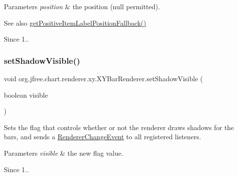 \begin{DoxyParams}{Parameters}
{\em position} & the position ({\ttfamily null} permitted).\\
\hline
\end{DoxyParams}
\begin{DoxySeeAlso}{See also}
\mbox{\hyperlink{classorg_1_1jfree_1_1chart_1_1renderer_1_1xy_1_1_x_y_bar_renderer_aef50803eeebe109e0a137245d5099f76}{get\+Positive\+Item\+Label\+Position\+Fallback()}} 
\end{DoxySeeAlso}
\begin{DoxySince}{Since}
1.. 
\end{DoxySince}
\mbox{\label{classorg_1_1jfree_1_1chart_1_1renderer_1_1xy_1_1_x_y_bar_renderer_aa5b0e04cebea57af1bcbf9193c007456}} 
\subsubsection{\texorpdfstring{set\+Shadow\+Visible()}{setShadowVisible()}}
{\footnotesize\ttfamily void org.\+jfree.\+chart.\+renderer.\+xy.\+X\+Y\+Bar\+Renderer.\+set\+Shadow\+Visible (\begin{DoxyParamCaption}\item[{boolean}]{visible }\end{DoxyParamCaption})}

Sets the flag that controls whether or not the renderer draws shadows for the bars, and sends a \mbox{\hyperlink{}{Renderer\+Change\+Event}} to all registered listeners.


\begin{DoxyParams}{Parameters}
{\em visible} & the new flag value.\\
\hline
\end{DoxyParams}
\begin{DoxySince}{Since}
1.. 
\end{DoxySince}
\mbox{\label{classorg_1_1jfree_1_1chart_1_1renderer_1_1xy_1_1_x_y_bar_renderer_a22720779ca6dd4cf627e68c89045ff1d}} 
